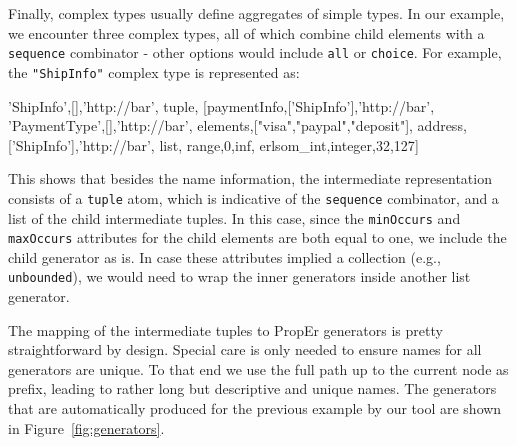\documentclass[submission,copyright]{eptcs}
\begin{document}
Finally, complex types usually define aggregates of simple types. In
our example, we encounter three complex types, all of which combine
child elements with a \texttt{sequence} combinator - other options
would include \texttt{all} or \texttt{choice}. For example, the
\texttt{"ShipInfo"} complex type is represented as:

\begin{lstline}
{{'ShipInfo',[],'http://bar'},
  {tuple,
    [{{paymentInfo,['ShipInfo'],'http://bar'},
      {{'PaymentType',[],'http://bar'},
       {elements,["visa","paypal","deposit"]}}},
     {{address,['ShipInfo'],'http://bar'},
      {list, {{range,0,inf}, {erlsom_int,integer,{32,127}}}}}]}}
\end{lstline}

This shows that besides the name information, the intermediate
representation consists of a \texttt{tuple} atom, which is indicative
of the \texttt{sequence} combinator, and a list of the child
intermediate tuples. In this case, since the \texttt{minOccurs} and
\texttt{maxOccurs} attributes for the child elements are both equal to
one, we include the child generator as is. In case these attributes
implied a collection (e.g., \texttt{unbounded}), we would need to wrap
the inner generators inside another list generator.


The mapping of the intermediate tuples to PropEr generators is pretty
straightforward by design. Special care is only needed to ensure names
for all generators are unique. To that end we use the full path up to
the current node as prefix, leading to rather long but descriptive and
unique names. The generators that are automatically produced for the
previous example by our tool are shown in Figure~\ref{fig:generators}.
\end{document}
